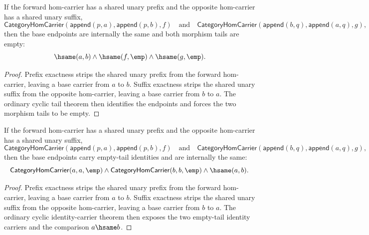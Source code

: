 \begin{theorem}
\label{thm:category-hom-carrier-unary-context-cycle-tails-empty}
If the forward hom-carrier has a shared unary prefix and the opposite
hom-carrier has a shared unary suffix,
$$
\mathsf{CategoryHomCarrier}(\mathsf{append}(p,a),\mathsf{append}(p,b),f)
\quad\text{and}\quad
\mathsf{CategoryHomCarrier}(\mathsf{append}(b,q),\mathsf{append}(a,q),g),
$$
then the base endpoints are internally the same and both morphism tails are
empty:
$$
\hsame(a,b)\land \hsame(f,\emp)\land \hsame(g,\emp).
$$
\end{theorem}
\begin{proof}
Prefix exactness strips the shared unary prefix from the forward hom-carrier,
leaving a base carrier from $a$ to $b$. Suffix exactness strips the shared
unary suffix from the opposite hom-carrier, leaving a base carrier from $b$ to
$a$. The ordinary cyclic tail theorem then identifies the endpoints and forces
the two morphism tails to be empty.
\end{proof}

\begin{theorem}
\label{thm:category-hom-carrier-unary-context-cycle-identity-carriers}
If the forward hom-carrier has a shared unary prefix and the opposite
hom-carrier has a shared unary suffix,
$$
\mathsf{CategoryHomCarrier}(\mathsf{append}(p,a),\mathsf{append}(p,b),f)
\quad\text{and}\quad
\mathsf{CategoryHomCarrier}(\mathsf{append}(b,q),\mathsf{append}(a,q),g),
$$
then the base endpoints carry empty-tail identities and are internally the
same:
$$
\mathsf{CategoryHomCarrier}(a,a,\emp)\land
\mathsf{CategoryHomCarrier}(b,b,\emp)\land
\hsame(a,b).
$$
\end{theorem}
\begin{proof}
Prefix exactness strips the shared unary prefix from the forward hom-carrier,
leaving a base carrier from $a$ to $b$. Suffix exactness strips the shared
unary suffix from the opposite hom-carrier, leaving a base carrier from $b$ to
$a$. The ordinary cyclic identity-carrier theorem then exposes the two
empty-tail identity carriers and the comparison $a\hsame b$.
\end{proof}

